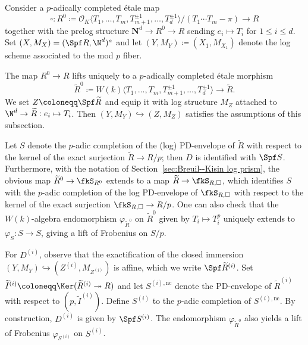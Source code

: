 \begin{eg}\label{eg:BreuilSR}
Consider a $p$-adically completed \'etale map 
\[
\square\colon R^0\coloneqq \mathcal{O}_K \langle T_1, \ldots, T_m, T_{m+1}^{\pm 1}, \ldots, T_d^{\pm 1}\rangle / (T_1\cdots T_m - \pi) \rightarrow R
\]
together with the prelog structure $\mathbf{N}^d \rightarrow R^0\rightarrow R$ sending $e_i \mapsto T_i$ for $1 \leq i \leq d$. Set $(X,M_X)=(\Spf R, \N^d)^a$ and let $(Y,M_Y)\coloneqq (X_1,M_{X_1})$ denote the log scheme associated to the mod $p$ fiber.

The map $R^0\rightarrow R$ lifts uniquely to a $p$-adically completed \'etale morphism 
\[
\widetilde{R}^0\coloneqq W(k)\langle T_1, \ldots, T_m, T_{m+1}^{\pm 1}, \ldots, T_d^{\pm 1}\rangle\rightarrow \widetilde{R}. 
\]
We set $Z\coloneqq \Spf \widetilde{R}$ and equip it with log structure $M_Z$ attached to $\N^d\rightarrow \widetilde{R}: e_i\mapsto T_i$. Then $(Y,M_Y)\hookrightarrow (Z,M_Z)$ satisfies the assumptions of this subsection. 

Let $S$ denote the $p$-adic completion of the (log) PD-envelope of $\widetilde{R}$ with respect to the kernel of the exact surjection $\widetilde{R}\rightarrow R/p$; then $D$ is identified with $\Spf S$. Furthermore, with the notation of Section~\ref{sec:Breuil--Kisin log prism}, the obvious map $\widetilde{R}^0\rightarrow \fkS_{R^0}$ extends to a map $\widetilde{R}\rightarrow \fkS_{R,\square}$, which identifies $S$ with the $p$-adic completion of the log PD-envelope of $\fkS_{R,\square}$ with respect to the kernel of the exact surjection $\fkS_{R,\square} \to R/p$. One can also check that the $W(k)$-algebra endomorphism $\varphi_{\widetilde{R}^0}$ on $\widetilde{R}^0$ given by $T_i\mapsto T_i^p$ uniquely extends to $\varphi_S\colon S\rightarrow S$, giving a lift of Frobenius on $S/p$.

For $D^{(i)}$, observe that the exactification of the closed immersion $(Y,M_Y)\hookrightarrow (Z^{(i)},M_{Z^{(i)}})$ is affine, which we write $\Spf \widetilde{R}^{(i)}$. Set $\widetilde{I}^{(i)}\coloneqq \Ker(\widetilde{R}^{(i)}\twoheadrightarrow R)$ and let $S^{(i),\mathrm{nc}}$ denote the PD-envelope of $\widetilde{R}^{(i)}$ with respect to $(p,\widetilde{I}^{(i)})$. Define $S^{(i)}$ to the $p$-adic completion of $S^{(i),\mathrm{nc}}$. By construction, $D^{(i)}$ is given by $\Spf S^{(i)}$. The endomorphism $\varphi_{\widetilde{R}^0}$ also yields a lift of Frobenius $\varphi_{S^{(i)}}$ on $S^{(i)}$.


\end{eg}
